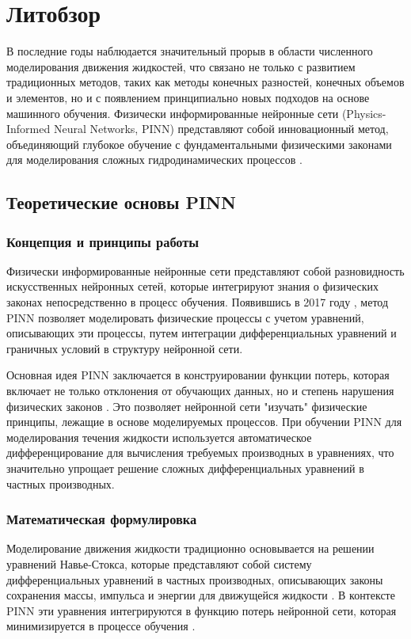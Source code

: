 \chapter{Литобзор}

В последние годы наблюдается значительный прорыв в области численного моделирования движения жидкостей,
что связано не только с развитием традиционных методов, таких как методы конечных разностей, конечных
объемов и элементов, но и с появлением принципиально новых подходов на основе машинного обучения.
Физически информированные нейронные сети (Physics-Informed Neural Networks, PINN) представляют собой
инновационный метод, объединяющий глубокое обучение с фундаментальными физическими законами для
моделирования сложных гидродинамических процессов \cite{raissi2019physics}.

\section{Теоретические основы PINN}
\subsection{Концепция и принципы работы}
Физически информированные нейронные сети представляют собой разновидность искусственных нейронных сетей,
которые интегрируют знания о физических законах непосредственно в процесс обучения. Появившись в 2017
году \cite{raissi2017physics}, метод PINN позволяет моделировать физические процессы с учетом уравнений,
описывающих эти процессы, путем интеграции дифференциальных уравнений и граничных условий в структуру
нейронной сети.

Основная идея PINN заключается в конструировании функции потерь, которая включает не только отклонения
от обучающих данных, но и степень нарушения физических законов \cite{karniadakis2021physics}. Это
позволяет нейронной сети "изучать" физические принципы, лежащие в основе моделируемых процессов. При
обучении PINN для моделирования течения жидкости используется автоматическое дифференцирование для
вычисления требуемых производных в уравнениях, что значительно упрощает решение сложных дифференциальных
уравнений в частных производных.

\subsection{Математическая формулировка}
Моделирование движения жидкости традиционно основывается на решении уравнений Навье-Стокса, которые
представляют собой систему дифференциальных уравнений в частных производных, описывающих законы сохранения
массы, импульса и энергии для движущейся жидкости \cite{batchelor2000introduction}. В контексте PINN эти
уравнения интегрируются в функцию потерь нейронной сети, которая минимизируется в процессе
обучения \cite{yang2019adversarial}.

